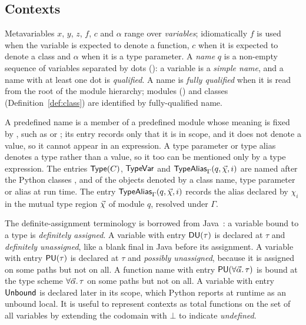 \subsection{Contexts}
\label{sec:contexts}

Metavariables $x$, $y$, $z$, $f$, $c$ and $\alpha$ range over \emph{variables}; idiomatically $f$ is used when the variable is expected to denote a function, $c$ when it is expected to denote a class and $\alpha$ when it is a type parameter. A \emph{name} $q$ is a non-empty sequence of variables separated by dots (): a variable is a \emph{simple name}, and a name with at least one dot is \emph{qualified}. A name is \emph{fully qualified} when it is read from the root of the module hierarchy; modules () and classes (Definition~\ref{def:class}) are identified by fully-qualified name.



\noindent A predefined name is a member of a predefined module whose meaning is fixed by \PurePy, such as  or
; its entry records only that it is in scope, and it does not denote a value, so it cannot appear in
an expression. A type parameter or type alias denotes a type rather than a value, so it too can be mentioned only by a type
expression. The entries $\mathsf{Type}(C)$, $\mathsf{TypeVar}$ and $\TypeAlias[\Gamma]{q}{\seq{\chi}}{i}$ are
named after the Python classes ,  and  of
the objects denoted by a class name, type parameter or alias at run time. The entry $\TypeAlias[\Gamma]{q}{\seq{\chi}}{i}$ records the alias declared by $\chi_i$ in
the mutual type region $\seq{\chi}$ of module $q$, resolved under $\Gamma$.

The definite-assignment terminology is borrowed from Java~\citep[\S16]{gosling2025}: a variable bound to a type is \emph{definitely assigned}. A variable with entry $\mathsf{DU}(\tau)$ is declared at $\tau$
and \emph{definitely unassigned}, like a blank final in Java before its assignment. A variable with entry $\mathsf{PU}(\tau)$
is declared at $\tau$ and \emph{possibly unassigned}, because it is assigned on some paths but not on all. A function name with entry $\PU{\scheme{\seq{\alpha}}{\tau}}$ is bound at the type scheme $\scheme{\seq{\alpha}}{\tau}$ on some paths but not on all. A variable
with entry $\mathsf{Unbound}$ is declared later in its scope, which Python reports at runtime as an unbound local.
It is useful to represent contexts as total functions on the set of all variables by extending the codomain with $\bot$ to indicate \emph{undefined}.


